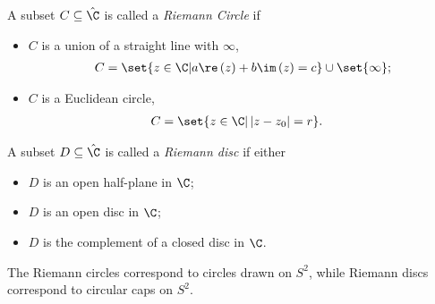 \documentclass[10pt]{mypackage}
\begin{document}
\begin{definition}
  A subset $C\subseteq \hat{\C}$ is called a \textit{Riemann Circle} if
  \begin{itemize}
    \item $C$ is a union of a straight line with $\infty$,
      \begin{align*}
        C = \set{z\in \C | a\re\left( z \right) + b\im\left( z \right) = c} \cup \set{\infty};
      \end{align*}
    \item $C$ is a Euclidean circle,
      \begin{align*}
        C &= \set{z\in \C | \left\vert z-z_0 \right\vert = r}.
      \end{align*}
  \end{itemize}
  A subset $D\subseteq \hat{\C}$ is called a \textit{Riemann disc} if either
  \begin{itemize}
    \item $D$ is an open half-plane in $\C$;
    \item $D$ is an open disc in $\C$;
    \item $D$ is the complement of a closed disc in $\C$.
  \end{itemize}
\end{definition}
\begin{note}
  The Riemann circles correspond to circles drawn on $S^{2}$, while Riemann discs correspond to circular caps on $S^{2}$.
\end{note}
\end{document}
